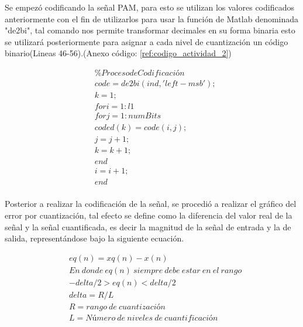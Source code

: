 Se empezó codificando la señal PAM, para esto se utilizan los valores codificados anteriormente con el fin de utilizarlos para usar la función de Matlab denominada "de2bi", tal comando nos permite transformar decimales en su forma binaria esto se utilizará posteriormente para asignar a cada nivel de cuantización un código binario(Lineas 46-56).(Anexo código: \ref{ref:codigo_actividad_2})

\begin{equation} \label{eq:Codificacion_y_Error_de_cuantificacion}
\begin{split} 
&\%Proceso de Codificación \\
& code=de2bi(ind,'left-msb'); \\
& k=1; \\
& for i=1:l1 \\
&	for j=1:numBits \\
&		coded(k)=code(i,j); \\
&		j=j+1; \\
&		k=k+1; \\
&	end \\
&	i=i+1; \\
& end \\
\end{split}
\end{equation}

Posterior a realizar la codificación de la señal, se procedió a realizar el gráfico del error por cuantización, tal efecto se define como la diferencia del valor real de la señal y la señal cuantificada, es decir la magnitud de la señal de entrada y la de salida, representándose bajo la siguiente ecuación.

\begin{equation} \label{eq:Codificacion_y_Error_de_cuantificacion_2}
\begin{split} 
&eq(n)=xq(n)-x(n) \\
&En\ donde\ eq(n)\ siempre\ debe\ estar\ en\ el\ rango \\
&-delta/2>eq(n)<delta/2 \\
&delta=R/L \\
&R=rango\ de\ cuantización \\
&L=Número\ de\ niveles\ de\ cuantificación \\
\end{split}
\end{equation}










